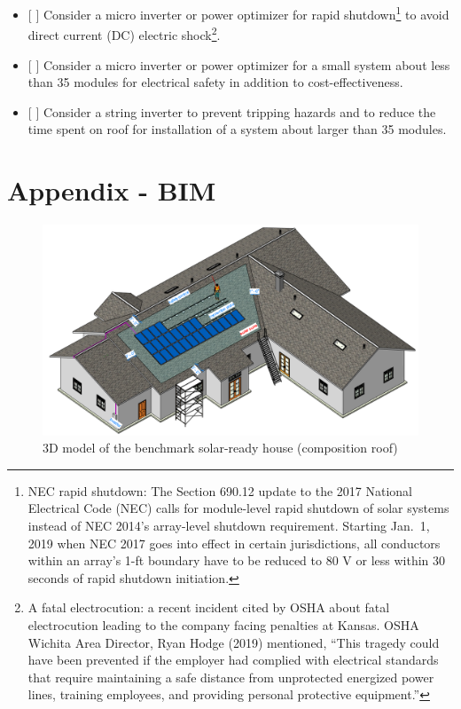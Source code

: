 \documentclass[]{article}
\providecommand{\tightlist}{%
  \setlength{\itemsep}{0pt}\setlength{\parskip}{0pt}}
\let\rmarkdownfootnote\footnote%
\def\footnote{\protect\rmarkdownfootnote}
\begin{document}
\begin{itemize}
\tightlist
\item
  {[} {]} Consider a micro inverter or power optimizer for rapid
  shutdown\footnote{NEC rapid shutdown: The Section 690.12 update to the
    2017 National Electrical Code (NEC) calls for module-level rapid
    shutdown of solar systems instead of NEC 2014's array-level shutdown
    requirement. Starting Jan.~1, 2019 when NEC 2017 goes into effect in
    certain jurisdictions, all conductors within an array's 1-ft
    boundary have to be reduced to 80 V or less within 30 seconds of
    rapid shutdown initiation.} to avoid direct current (DC) electric
  shock\footnote{A fatal electrocution: a recent incident cited by OSHA
    about fatal electrocution leading to the company facing penalties at
    Kansas. OSHA Wichita Area Director, Ryan Hodge (2019) mentioned,
    ``This tragedy could have been prevented if the employer had
    complied with electrical standards that require maintaining a safe
    distance from unprotected energized power lines, training employees,
    and providing personal protective equipment.''}.
\item
  {[} {]} Consider a micro inverter or power optimizer for a small
  system about less than 35 modules for electrical safety in addition to
  cost-effectiveness.
\item
  {[} {]} Consider a string inverter to prevent tripping hazards and to
  reduce the time spent on roof for installation of a system about
  larger than 35 modules.
\end{itemize}

\hypertarget{appendix---bim}{%
\section{Appendix - BIM}\label{appendix---bim}}

\begin{figure}
\centering
\includegraphics{3d_2.png}
\caption{3D model of the benchmark solar-ready house (composition roof)}
\end{figure}
\end{document}
